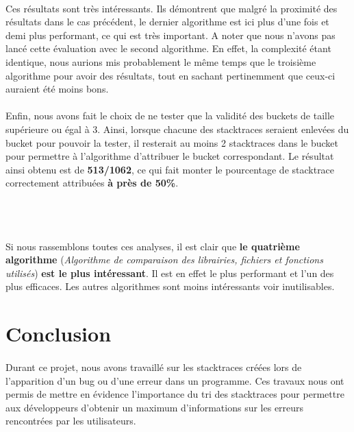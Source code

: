 \documentclass{article}
\begin{document}
\paragraph{}
Ces résultats sont très intéressants. Ils démontrent que malgré la proximité des résultats dans le cas précédent, le dernier algorithme est ici plus d'une fois et demi plus performant, ce qui est très important. A noter que nous n'avons pas lancé cette évaluation avec le second algorithme. En effet, la complexité étant identique, nous aurions mis probablement le même temps que le troisième algorithme pour avoir des résultats, tout en sachant pertinemment que ceux-ci auraient été moins bons.

\paragraph{}
Enfin, nous avons fait le choix de ne tester que la validité des buckets de taille supérieure ou égal à 3. Ainsi, lorsque chacune des stacktraces seraient enlevées du bucket pour pouvoir la tester, il resterait au moins 2 stacktraces dans le bucket pour permettre à l'algorithme d'attribuer le bucket correspondant. Le résultat ainsi obtenu est de \textbf{513/1062}, ce qui fait monter le pourcentage de stacktrace correctement attribuées \textbf{à près de 50\%}.

~~\\
~~\\

\paragraph{}
Si nous rassemblons toutes ces analyses, il est clair que \textbf{le quatrième algorithme} (\textit{Algorithme de comparaison des librairies, fichiers et fonctions utilisés}) \textbf{est le plus intéressant}. Il est en effet le plus performant et l'un des plus efficaces. Les autres algorithmes sont moins intéressants voir inutilisables.

\clearpage
\section*{Conclusion}

\paragraph{}
Durant ce projet, nous avons travaillé sur les stacktraces créées lors de l'apparition d'un bug ou d'une erreur dans un programme. Ces travaux nous ont permis de mettre en évidence l'importance du tri des stacktraces pour permettre aux développeurs d'obtenir un maximum d'informations sur les erreurs rencontrées par les utilisateurs.
\end{document}
